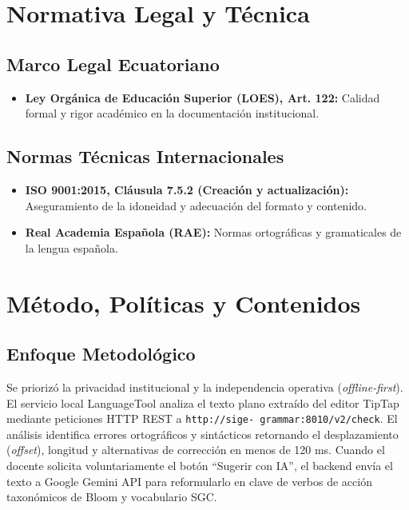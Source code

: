 \documentclass[12pt,a4paper]{article}
\begin{document}
\section{Normativa Legal y Técnica}
\subsection{Marco Legal Ecuatoriano}
\begin{itemize}[leftmargin=1.5em, itemsep=2pt]
    \item \textbf{Ley Orgánica de Educación Superior (LOES), Art. 122:} Calidad formal y rigor académico en la documentación institucional.
\end{itemize}
\subsection{Normas Técnicas Internacionales}
\begin{itemize}[leftmargin=1.5em, itemsep=2pt]
    \item \textbf{ISO 9001:2015, Cláusula 7.5.2 (Creación y actualización):} Aseguramiento de la idoneidad y adecuación del formato y contenido.
    \item \textbf{Real Academia Española (RAE):} Normas ortográficas y gramaticales de la lengua española.
\end{itemize}

\section{Método, Políticas y Contenidos}
\subsection{Enfoque Metodológico}
Se priorizó la privacidad institucional y la independencia operativa (\textit{offline-first}). El servicio local LanguageTool analiza el texto plano extraído del editor TipTap mediante peticiones HTTP REST a \texttt{http://\allowbreak  sige- grammar:8010/\allowbreak  v2/\allowbreak  check}. El análisis identifica errores ortográficos y sintácticos retornando el desplazamiento (\textit{offset}), longitud y alternativas de corrección en menos de 120 ms. Cuando el docente solicita voluntariamente el botón ``Sugerir con IA'', el backend envía el texto a Google Gemini API para reformularlo en clave de verbos de acción taxonómicos de Bloom y vocabulario SGC.
\end{document}
